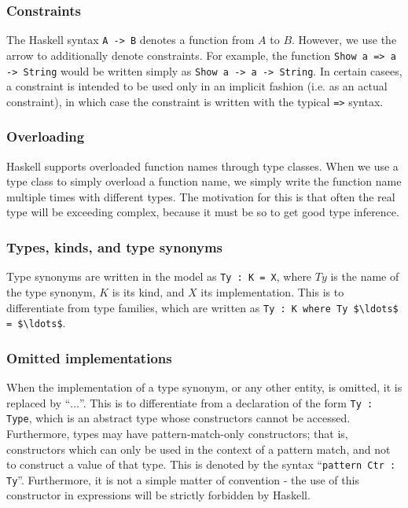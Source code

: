\documentclass[12pt, svgnames]{article}
\let\Oldsubsubsection\subsubsection
\renewcommand{\subsubsection}{\FloatBarrier\Oldsubsubsection}
\begin{document}
\subsubsection*{Constraints}
The Haskell syntax \texttt{A -> B} denotes a function from $A$ to $B$. However,
we use the arrow to additionally denote constraints. For example, the function
\texttt{Show a => a -> String} would be written simply as \lstinline!Show a -> a -> String!.
In certain casees, a constraint is intended to be used only in an implicit fashion 
(i.e. as an actual constraint), in which case the constraint is written with 
the typical \lstinline{=>} syntax. 

\subsubsection*{Overloading}
Haskell supports overloaded function names through type classes. When we use a type 
class to simply overload a function name, we simply write the function name
multiple times with different types. The motivation for this is that often the 
real type will be exceeding complex, because it must be so to get good type inference. 

\subsubsection*{Types, kinds, and type synonyms}
Type synonyms are written in the model as \lstinline!Ty : K = X!, where $Ty$ is the name
of the type synonym, $K$ is its kind, and $X$ its implementation. This is to differentiate
from type families, which are written as \lstinline!Ty : K where Ty $\ldots$ = $\ldots$!. 

\subsubsection*{Omitted implementations}
When the implementation of a type synonym, or any other entity, is omitted, it
is replaced by ``$\ldots$''. This is to differentiate from a declaration of the form
\lstinline!Ty : Type!, which is an abstract type whose constructors cannot be
accessed. Furthermore, types may have pattern-match-only constructors; that is,
constructors which can only be used in the context of a pattern match, and not
to construct a value of that type. This is denoted by the syntax
``\lstinline!pattern Ctr : Ty!''. Furthermore, it is not a simple matter of
convention - the use of this constructor in expressions will be strictly
forbidden by Haskell.
\end{document}
